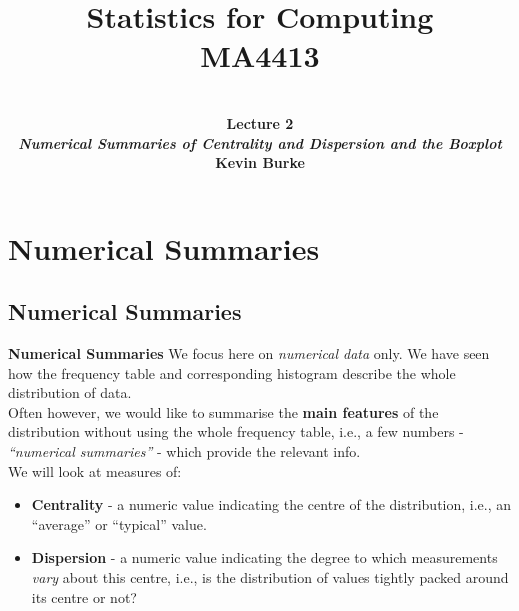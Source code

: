 \documentclass[compress]{beamer}        %
\title{{\huge Statistics for Computing\\[0.1cm]MA4413}}
\author[Kevin Burke]{{\bf\\[0.5cm]{\huge Lecture 2}\\[0.2cm]\emph{Numerical Summaries of Centrality and Dispersion and the Boxplot}\\[1.4cm]Kevin Burke}\\[0.3cm]\tcb{kevin.burke@ul.ie}}
\institute[University of Limerick, Maths \& Stats Dept]{}
\date{}
\makeatletter
\newcommand{\tcb}{\textcolor{beamer@blendedblue}}
\makeatother
\begin{document}
\begin{frame}[t]
\titlepage
\end{frame}


\section{Numerical Summaries}
\subsection{Numerical Summaries}
\begin{frame}{\bf \tcb{Numerical Summaries}}
We focus here on \emph{numerical data} only. We have seen how the frequency table and corresponding histogram describe the whole distribution of data.\\[0.4cm]
Often however, we would like to summarise the {\bf main features} of the distribution without using the whole frequency table, i.e., a few numbers - \emph{``numerical summaries''} - which provide the relevant info.\\[0.5cm]
We will look at measures of:
\begin{itemize}\itemsep0.4cm
\item {\bf Centrality} - a numeric value indicating the centre of the distribution, i.e., an ``average'' or ``typical'' value.
\item {\bf Dispersion} - a numeric value indicating the degree to which measurements \emph{vary} about this centre, i.e., is the distribution of values tightly packed around its centre or not?
\end{itemize}

\end{frame}
\end{document}
